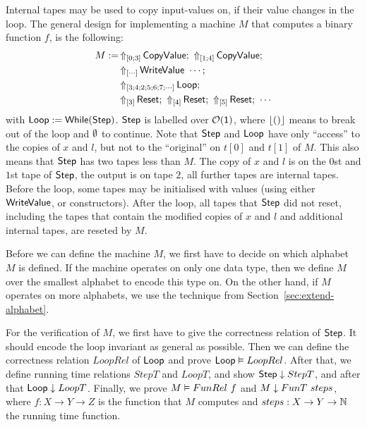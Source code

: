Internal tapes may be used to copy input-values on, if their value changes in the loop.  The general design for implementing a machine $M$ that
computes a binary function $f$, is the following:
\begin{align*}
  M := & \LiftTapes{\MS{CopyValue}}{\Vector{0; 3}} \Seq \LiftTapes{\MS{CopyValue}}{\Vector{1; 4}} \Seq \\
       & \LiftTapes{\MS{WriteValue}~\cdots}{\Vector{\cdots}} \Seq \\
       & \LiftTapes{\MS{Loop}}{\Vector{3; 4; 2; 5; 6; 7; \cdots}} \Seq \\
       & \LiftTapes{\MS{Reset}}{\Vector{3}} \Seq \LiftTapes{\MS{Reset}}{\Vector{4}} \Seq \LiftTapes{\MS{Reset}}{\Vector{5}} \Seq \cdots
\end{align*}
with $\mathsf{Loop} := \mathsf{While}(\mathsf{Step})$.  $\mathsf{Step}$ is labelled over $\mathcal{O}(\mathsf{1})$, where $\left\lfloor {\ensuremath{\mathsf{()}}} \right\rfloor$ means to break out of the loop and
$\emptyset$ to continue.  Note that $\mathsf{Step}$ and $\mathsf{Loop}$ have only ``access'' to the copies of $x$ and $l$, but not to the ``original'' on $t[0]$
and $t[1]$ of $M$.  This also means that $\mathsf{Step}$ has two tapes less than $M$.  The copy of $x$ and $l$ is on the $0$st and $1$st tape of
$\mathsf{Step}$, the output is on tape $2$, all further tapes are internal tapes.  Before the loop, some tapes may be initialised with values (using
either $\mathsf{WriteValue}$, or constructors).  After the loop, all tapes that $\mathsf{Step}$ did not reset, including the tapes that contain the modified
copies of $x$ and $l$ and additional internal tapes, are reseted by $M$.

Before we can define the machine $M$, we first have to decide on which alphabet $M$ is defined.  If the machine operates on only one data type, then
we define $M$ over the smallest alphabet to encode this type on.  On the other hand, if $M$ operates on more alphabets, we use the technique from
Section~\ref{sec:extend-alphabet}.

For the verification of $M$, we first have to give the correctness relation of $\mathsf{Step}$.  It should encode the loop invariant as general as
possible.  Then we can define the correctness relation $LoopRel$ of $\mathsf{Loop}$ and prove $\mathsf{Loop} \mathrel{\vDash} LoopRel$.  After that, we define running
time relations $StepT$ and $LoopT$, and show $\mathsf{Step} \mathrel{\downarrow} StepT$, and after that $\mathsf{Loop} \mathrel{\downarrow} LoopT$.  Finally, we prove
$M \mathrel{\vDash} FunRel~f$ and $M \mathrel{\downarrow} FunT~steps$, where $f:X \to Y \to Z$ is the function that $M$ computes and $steps:X \rightarrow Y \rightarrow \mathbb{N}$ the
running time function.


